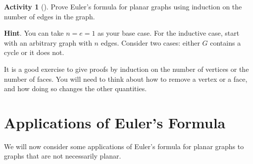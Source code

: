 \documentclass[10pt,]{book}
\theoremstyle{plain}
\theoremstyle{definition}
\theoremstyle{definition}
\theoremstyle{definition}
\newtheorem{activity}[project]{Activity}
\numberwithin{equation}{chapter}
\begin{document}
\begin{activity}[]\label{activity-20}
\hypertarget{p-258}{}%
Prove Euler's formula for planar graphs using induction on the number of edges in the graph.%
\par\smallskip%
\noindent\textbf{Hint}.\hypertarget{hint-7}{}\quad%
\hypertarget{p-259}{}%
You can take \(n = e = 1\) as your base case.  For the inductive case, start with an arbitrary graph with \(n\) edges.  Consider two cases: either \(G\) contains a cycle or it does not.%
\end{activity}
\hypertarget{p-260}{}%
It is a good exercise to give proofs by induction on the number of vertices or the number of faces.  You will need to think about how to remove a vertex or a face, and how doing so changes the other quantities.%
\typeout{************************************************}
\typeout{************************************************}
\section[{Applications of Euler's Formula}]{Applications of Euler's Formula}\label{sec_planar}
\hypertarget{p-261}{}%
We will now consider some applications of Euler's formula for planar graphs to graphs that are not necessarily planar.%
\typeout{************************************************}
\typeout{************************************************}
\end{document}
